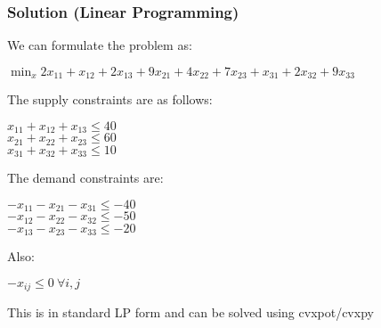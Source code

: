 \documentclass{beamer}
\begin{document}
\begin{frame}

\frametitle{Solution (Linear Programming)}

We can formulate the problem as:
\begin{center}
   $\min_{x} 2x_{11}+x_{12}+2x_{13}+9x_{21}+4x_{22}+7x_{23}+x_{31}+2x_{32}+9x_{33} $\\
\end{center}
The supply constraints are as follows:\\
\begin{center}
   $x_{11}+x_{12}+x_{13} \leq 40$\\
$x_{21}+x_{22}+x_{23} \leq 60$\\
$x_{31}+x_{32}+x_{33} \leq 10$\\ 
\end{center}
The demand constraints are:\\

\begin{center}

$-x_{11}-x_{21}-x_{31} \leq -40$\\
$-x_{12}-x_{22}-x_{32} \leq -50$\\
$-x_{13}-x_{23}-x_{33} \leq -20$\\
\end{center}
Also:\\
\begin{center}
$-x_{ij} \leq 0 \: \forall i,j $\\
\end{center}

This is in standard LP form and can be solved using cvxpot/cvxpy

\end{frame}







\end{document}
